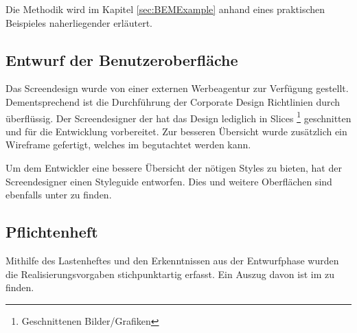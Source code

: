 Die Methodik wird im Kapitel \ref{sec:BEMExample} anhand eines
praktischen Beispieles naherliegender erläutert.

\subsection{Entwurf der Benutzeroberfläche}
\label{sec:Benutzeroberflaeche} 
Das Screendesign wurde von einer externen Werbeagentur zur Verfügung gestellt.
Dementsprechend ist die Durchführung der Corporate Design Richtlinien durch \mh
überflüssig.
Der Screendesigner der \mh hat das Design lediglich in Slices \footnote{Geschnittenen Bilder/Grafiken} 
geschnitten und für die Entwicklung vorbereitet. Zur besseren Übersicht wurde
zusätzlich ein Wireframe gefertigt, welches im 
begutachtet werden kann.

Um dem Entwickler eine bessere Übersicht der nötigen Styles zu bieten, hat der
Screendesigner einen Styleguide entworfen. Dies und weitere Oberflächen sind
ebenfalls unter  zu finden.

\subsection{Pflichtenheft}
\label{sec:Pflichtenheft}
Mithilfe des Lastenheftes und den Erkenntnissen aus der Entwurfphase wurden
die Realisierungsvorgaben stichpunktartig erfasst. Ein Auszug davon ist im
 zu finden.
